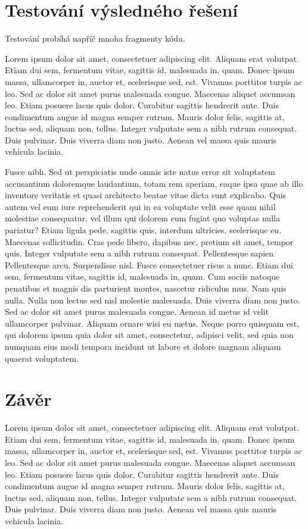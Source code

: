 \documentclass[czech,master,dept460,male,cpp,cpdeclaration]{diploma}
\begin{document}
\section{Testování výsledného řešení}
Testování probíhá napříč mnoha fragmenty kódu.


Lorem ipsum dolor sit amet, consectetuer adipiscing elit. Aliquam erat volutpat. Etiam dui sem, fermentum vitae, sagittis id, malesuada in, quam. Donec ipsum massa, ullamcorper in, auctor et, scelerisque sed, est. Vivamus porttitor turpis ac leo. Sed ac dolor sit amet purus malesuada congue. Maecenas aliquet accumsan leo. Etiam posuere lacus quis dolor. Curabitur sagittis hendrerit ante. Duis condimentum augue id magna semper rutrum. Mauris dolor felis, sagittis at, luctus sed, aliquam non, tellus. Integer vulputate sem a nibh rutrum consequat. Duis pulvinar. Duis viverra diam non justo. Aenean vel massa quis mauris vehicula lacinia.

Fusce nibh. Sed ut perspiciatis unde omnis iste natus error sit voluptatem accusantium doloremque laudantium, totam rem aperiam, eaque ipsa quae ab illo inventore veritatis et quasi architecto beatae vitae dicta sunt explicabo. Quis autem vel eum iure reprehenderit qui in ea voluptate velit esse quam nihil molestiae consequatur, vel illum qui dolorem eum fugiat quo voluptas nulla pariatur? Etiam ligula pede, sagittis quis, interdum ultricies, scelerisque eu. Maecenas sollicitudin. Cras pede libero, dapibus nec, pretium sit amet, tempor quis. Integer vulputate sem a nibh rutrum consequat. Pellentesque sapien. Pellentesque arcu. Suspendisse nisl. Fusce consectetuer risus a nunc. Etiam dui sem, fermentum vitae, sagittis id, malesuada in, quam. Cum sociis natoque penatibus et magnis dis parturient montes, nascetur ridiculus mus. Nam quis nulla. Nulla non lectus sed nisl molestie malesuada. Duis viverra diam non justo. Sed ac dolor sit amet purus malesuada congue. Aenean id metus id velit ullamcorper pulvinar. Aliquam ornare wisi eu metus. Neque porro quisquam est, qui dolorem ipsum quia dolor sit amet, consectetur, adipisci velit, sed quia non numquam eius modi tempora incidunt ut labore et dolore magnam aliquam quaerat voluptatem.

\section{Závěr}
Lorem ipsum dolor sit amet, consectetuer adipiscing elit. Aliquam erat volutpat. Etiam dui sem, fermentum vitae, sagittis id, malesuada in, quam. Donec ipsum massa, ullamcorper in, auctor et, scelerisque sed, est. Vivamus porttitor turpis ac leo. Sed ac dolor sit amet purus malesuada congue. Maecenas aliquet accumsan leo. Etiam posuere lacus quis dolor. Curabitur sagittis hendrerit ante. Duis condimentum augue id magna semper rutrum. Mauris dolor felis, sagittis at, luctus sed, aliquam non, tellus. Integer vulputate sem a nibh rutrum consequat. Duis pulvinar. Duis viverra diam non justo. Aenean vel massa quis mauris vehicula lacinia.
\end{document}
